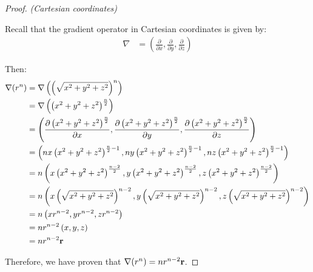 \begin{proof}
\textit{(Cartesian coordinates)}

Recall that the gradient operator in Cartesian coordinates is given by:
\begin{align}
    \nabla &= \left(\frac{\partial}{\partial x}, \frac{\partial}{\partial y}, \frac{\partial}{\partial z}\right)
\end{align}

Then:
\begin{align*}
    \nabla(r^n) &= \nabla\left(\left(\sqrt{x^2 + y^2 + z^2}\right)^n\right) \\
    &= \nabla\left(\left(x^2 + y^2 + z^2\right)^{\frac{n}{2}}\right) \\
    &= \left(\frac{\partial \left(x^2 + y^2 + z^2\right)^{\frac{n}{2}}}{\partial x}, \frac{\partial \left(x^2 + y^2 + z^2\right)^{\frac{n}{2}}}{\partial y}, \frac{\partial \left(x^2 + y^2 + z^2\right)^{\frac{n}{2}}}{\partial z}\right) \\
    &= \left(nx \left(x^2 + y^2 + z^2\right)^{\frac{n}{2} - 1}, ny \left(x^2 + y^2 + z^2\right)^{\frac{n}{2} - 1}, nz \left(x^2 + y^2 + z^2\right)^{\frac{n}{2} - 1}\right) \\
    &= n\left(x \left(x^2 + y^2 + z^2\right)^{\frac{n - 2}{2}}, y \left(x^2 + y^2 + z^2\right)^{\frac{n - 2}{2}}, z \left(x^2 + y^2 + z^2\right)^{\frac{n - 2}{2}}\right) \\
    &= n\left(x \left(\sqrt{x^2 + y^2 + z^2}\right)^{n-2}, y \left(\sqrt{x^2 + y^2 + z^2}\right)^{n-2}, z \left(\sqrt{x^2 + y^2 + z^2}\right)^{n-2}\right) \\
    &= n\left(x r^{n - 2}, y r^{n - 2}, z r^{n - 2}\right) \\
    &= n r^{n - 2}\left(x, y, z\right) \\
    &= n r^{n - 2} \vb{r}
\end{align*}

Therefore, we have proven that \(\nabla(r^n) = n r^{n - 2} \vb{r}\).
\end{proof}

